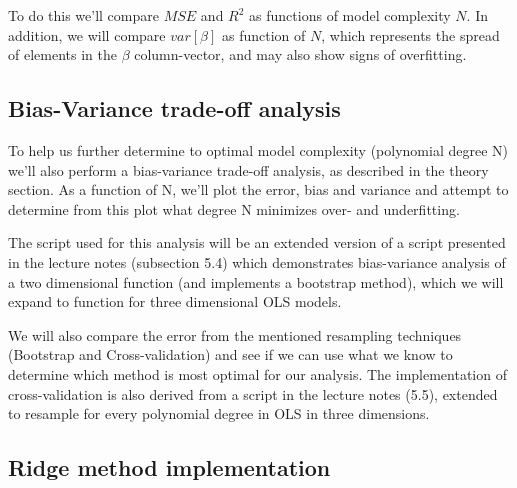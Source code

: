 \documentclass[reprint,english,notitlepage]{revtex4-1}  %
\begin{document}
To do this we'll compare $MSE$ and $R^2$ as functions of model complexity $N$. In addition, we will compare $var[\beta]$ as function of $N$, which represents the spread of elements in the $\beta$ column-vector, and may also show signs of overfitting.

\subsection{Bias-Variance trade-off analysis}

To help us further determine to optimal model complexity (polynomial degree N) we'll also perform a bias-variance trade-off analysis, as described in the theory section. As a function of N, we'll plot the error, bias and variance and attempt to determine from this plot what degree N minimizes over- and underfitting.

The script used for this analysis will be an extended version of a script presented in the lecture notes (subsection 5.4) which demonstrates bias-variance analysis of a two dimensional function (and implements a bootstrap method), which we will expand to function for three dimensional OLS models.

We will also compare the error from the mentioned resampling techniques (Bootstrap and Cross-validation) and see if we can use what we know to determine which method is most optimal for our analysis. The implementation of cross-validation is also derived from a script in the lecture notes (5.5), extended to resample for every polynomial degree in OLS in three dimensions.

\subsection{Ridge method implementation}
\end{document}
